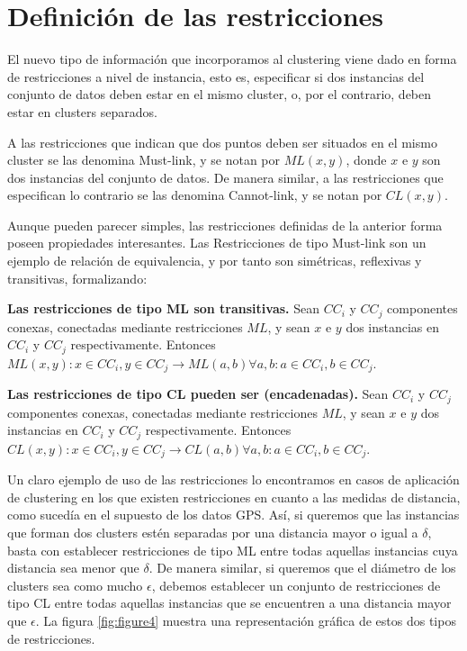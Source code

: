 \section{Definición de las restricciones}

El nuevo tipo de  información que incorporamos al clustering viene dado en forma de restricciones a nivel de instancia, esto es, especificar si dos instancias del conjunto de datos deben estar en el mismo cluster, o, por el contrario, deben estar en clusters separados.

A las restricciones que indican que dos puntos deben ser situados en el mismo cluster se las denomina Must-link, y se notan por $ML(x,y)$, donde $x$ e $y$ son dos instancias del conjunto de datos. De manera similar, a las restricciones que especifican lo contrario se las denomina Cannot-link, y se notan por $CL(x,y)$. \cite{WagstaffCardie:2000}

Aunque pueden parecer simples, las restricciones definidas de la anterior forma poseen propiedades interesantes. Las Restricciones de tipo Must-link son un ejemplo de relación de equivalencia, y por tanto son simétricas, reflexivas y transitivas, formalizando:

\begin{observacion}
	\textbf{Las restricciones de tipo ML son transitivas.} Sean $CC_i$ y $CC_j$ componentes conexas, conectadas mediante restricciones $ML$, y sean $x$ e $y$ dos instancias en $CC_i$ y $CC_j$ respectivamente. Entonces $ML(x,y): x \in CC_i, y \in CC_j \rightarrow ML(a,b) \forall a,b: a\in CC_i, b \in CC_j$. \cite{Survey:2007}
\end{observacion}

\begin{observacion}
	\textbf{Las restricciones de tipo CL pueden ser (encadenadas).} Sean $CC_i$ y $CC_j$ componentes conexas, conectadas mediante restricciones $ML$, y sean $x$ e $y$ dos instancias en $CC_i$ y $CC_j$ respectivamente. Entonces $CL(x,y): x \in CC_i, y \in CC_j \rightarrow CL(a,b) \forall a,b: a\in CC_i, b \in CC_j$. \cite{Survey:2007}
\end{observacion}

Un claro ejemplo de uso de las restricciones lo encontramos en casos de aplicación de clustering en los que existen restricciones en cuanto a las medidas de distancia, como sucedía en el supuesto de los datos GPS. Así, si queremos que las instancias que forman dos clusters estén separadas por una distancia mayor o igual a $\delta$, basta con establecer restricciones de tipo ML entre todas aquellas instancias cuya distancia sea menor que $\delta$. 
De manera similar, si queremos que el diámetro de los clusters sea como mucho $\epsilon$, debemos establecer un conjunto de restricciones de tipo CL entre todas aquellas instancias que se encuentren a una distancia mayor que $\epsilon$. La figura \ref{fig:figure4} muestra una representación gráfica de estos dos tipos de restricciones.

